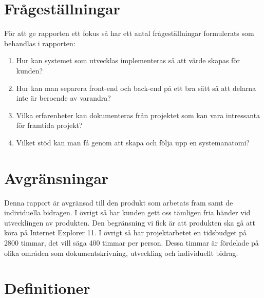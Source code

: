 \section{Frågeställningar}
För att ge rapporten ett fokus så har ett antal frågeställningar formulerats som behandlas i rapporten:
\begin{enumerate}
	\item Hur kan systemet som utvecklas implementeras så att värde skapas för kunden?
	\item Hur kan man separera front-end och back-end på ett bra sätt så att delarna inte är beroende av varandra?
	\item Vilka erfarenheter kan dokumenteras från projektet som kan vara intressanta för framtida projekt?
	\item Vilket stöd kan man få genom att skapa och följa upp en systemanatomi?
\end{enumerate}

\section{Avgränsningar}
Denna rapport är avgränsad till den produkt som arbetats fram samt de individuella bidragen. I övrigt så har kunden gett oss tämligen fria händer vid utvecklingen av produkten. Den begränsning vi fick är att produkten ska gå att köra på Internet Explorer 11.
I övrigt så har projektarbetet en tidsbudget på 2800 timmar, det vill säga 400 timmar per person. Dessa timmar är fördelade på olika områden som dokumentskrivning, utveckling och individuellt bidrag.

\section{Definitioner}

